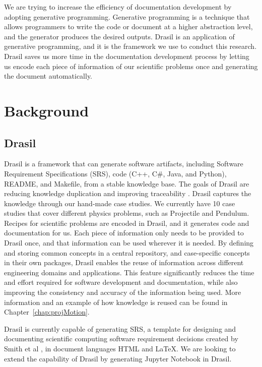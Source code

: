 We are trying to increase the efficiency of documentation development by 
adopting generative programming. Generative programming is a technique that 
allows programmers to write the code or document at a higher abstraction level, 
and the generator produces the desired outputs. Drasil is an application of 
generative programming, and it is the framework we use to conduct this 
research. Drasil saves us more time in the documentation development process by 
letting us encode each piece of information of our scientific problems once and 
generating the document automatically.


\section{Background}
\subsection{Drasil}
Drasil is a framework that can generate software artifacts, including Software 
Requirement Specifications (SRS), code (C++, C\#, Java, and Python), README, 
and Makefile, from a stable knowledge base. The goals of Drasil are reducing 
knowledge duplication and improving traceability \cite{drasil}. Drasil captures 
the knowledge through our hand-made case studies. We currently have 10 case 
studies that cover different physics problems, such as Projectile and Pendulum. 
Recipes for scientific problems are encoded in Drasil, and it generates code 
and documentation for us. Each piece of information only needs to be provided 
to Drasil once, and that information can be used wherever it is needed. By 
defining and storing common concepts in a central repository, and case-specific 
concepts in their own packages, Drasil enables the reuse of information across 
different engineering domains and applications. This feature significantly 
reduces the time and effort required for software development and 
documentation, while also improving the consistency and accuracy of the 
information being used. More information and an example of how knowledge is 
reused can be found in Chapter~\ref{chap:projMotion}. 

Drasil is currently capable of generating SRS, a template for designing and 
documenting scientific computing software requirement decisions created by 
Smith et al \cite{smith2005new}, in document languages HTML and LaTeX. We are 
looking to extend the capability of Drasil by generating Jupyter Notebook in 
Drasil.

